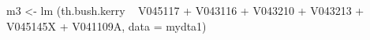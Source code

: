\begin{Schunk}
\begin{Sinput}
 m3 <- lm (th.bush.kerry ~ V045117 + V043116 + V043210 + V043213 + V045145X + V041109A, data = mydta1)
\end{Sinput}
\end{Schunk}
